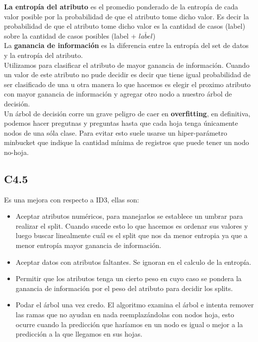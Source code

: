 \documentclass[titlepage,a4paper]{article}
\begin{document}
 \textbf{La entropía del atributo} es el promedio ponderado de la entropía de cada valor posible por la probabilidad de que el atributo tome dicho valor. Es decir la probabilidad de que el atributo tome dicho valor  es la cantidad de casos  (label) sobre la cantidad de casos posibles (label + $\bar{label}$) \\

La \textbf{ganancia de información} es la diferencia entre la entropía del set de datos y la  entropía del atributo. \\

Utilizamos para clasificar el atributo de mayor ganancia de información. Cuando un valor de este atributo no pude decidir es decir que tiene igual probabilidad de ser clasificado de una u otra manera lo que hacemos es elegir el proximo atributo con mayor ganancia de información y agregar otro nodo a nuestro árbol de decisión. \\

Un árbol de decisión corre un grave peligro de caer en \textbf{overfitting}, en definitiva, podemos hacer pregutnas y preguntas hasta que cada hoja tenga únicamente nodos de una sóla clase. Para evitar esto suele usarse un hiper-parámetro minbucket que indique la cantidad mínima de registros que puede tener un nodo no-hoja. 

\subsection*{C4.5}
Es una mejora con respecto a ID3, ellas son: 
\begin{itemize}
\item Aceptar atributos numéricos, para manejarlos se establece un umbrar para realizar el split. Cuando sucede esto lo que hacemos es ordenar sus valores y luego buscar linealmente cuál es el split que nos da menor entropia ya que a menor entropía mayor ganancia de información.  
\item Aceptar datos con atributos faltantes. Se ignoran en el calculo de la entropía. 
\item Permitir que los atributos tenga un cierto peso en cuyo caso se pondera la ganancia de información por el peso del atributo para decidir los splits. 
\item Podar el árbol una vez credo. El algoritmo examina el árbol e intenta remover las ramas que no ayudan en nada reemplazándolas con nodos hoja, esto ocurre cuando la predicción que haríamos en un nodo es igual o mejor a la predicción a la que llegamos en sus hojas. 
\end{itemize}
\end{document}
